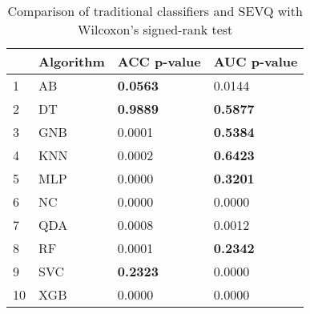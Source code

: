 \begin{table}[H]
\footnotesize
\centering
\caption{Comparison of traditional classifiers and SEVQ with Wilcoxon’s signed-rank test}
\label{tab:Traditional wilcoxon comparison}
\begin{tabular}{llll}
\hline
{} & Algorithm & ACC p-value &      AUC p-value \\
\hline
1  &        AB &  \textbf{0.0563} &           0.0144 \\
2  &        DT &  \textbf{0.9889} &  \textbf{0.5877} \\
3  &       GNB &           0.0001 &  \textbf{0.5384} \\
4  &       KNN &           0.0002 &  \textbf{0.6423} \\
5  &       MLP &           0.0000 &  \textbf{0.3201} \\
6  &        NC &           0.0000 &           0.0000 \\
7  &       QDA &           0.0008 &           0.0012 \\
8  &        RF &           0.0001 &  \textbf{0.2342} \\
9  &       SVC &  \textbf{0.2323} &           0.0000 \\
10 &       XGB &           0.0000 &           0.0000 \\
\hline
\end{tabular}
\end{table}
